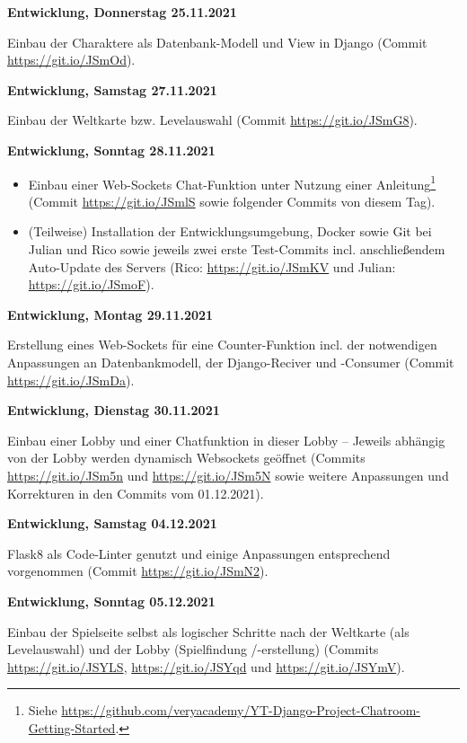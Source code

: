 \textbf{Entwicklung, Donnerstag 25.11.2021}

Einbau der Charaktere als Datenbank-Modell und View in Django (Commit \url{https://git.io/JSmOd}).



\textbf{Entwicklung, Samstag 27.11.2021}

Einbau der Weltkarte bzw. Levelauswahl (Commit \url{https://git.io/JSmG8}).



\textbf{Entwicklung, Sonntag 28.11.2021}

\begin{itemize}
    \item Einbau einer Web-Sockets Chat-Funktion unter Nutzung einer Anleitung\footnote{Siehe \url{https://github.com/veryacademy/YT-Django-Project-Chatroom-Getting-Started}. } (Commit \url{https://git.io/JSmlS} sowie folgender Commits von diesem Tag).
    \item (Teilweise) Installation der Entwicklungsumgebung, Docker sowie Git bei Julian und Rico sowie jeweils zwei erste Test-Commits incl. anschließendem Auto-Update des Servers (Rico: \url{https://git.io/JSmKV} und Julian: \url{https://git.io/JSmoF}).
\end{itemize}



\textbf{Entwicklung, Montag 29.11.2021}

Erstellung eines Web-Sockets für eine Counter-Funktion incl. der notwendigen Anpassungen an Datenbankmodell, der Django-Reciver und -Consumer (Commit \url{https://git.io/JSmDa}).



\textbf{Entwicklung, Dienstag 30.11.2021}

Einbau einer Lobby und einer Chatfunktion in dieser Lobby -- Jeweils abhängig von der Lobby werden dynamisch Websockets geöffnet (Commits \url{https://git.io/JSm5n} und \url{https://git.io/JSm5N} sowie weitere Anpassungen und Korrekturen in den Commits vom 01.12.2021).


\textbf{Entwicklung, Samstag 04.12.2021}

Flask8 als Code-Linter genutzt und einige Anpassungen entsprechend vorgenommen (Commit \url{https://git.io/JSmN2}).


\textbf{Entwicklung, Sonntag 05.12.2021}

Einbau der Spielseite selbst als logischer Schritte nach der Weltkarte (als Levelauswahl) und der Lobby (Spielfindung /-erstellung) (Commits \url{https://git.io/JSYLS}, \url{https://git.io/JSYqd} und \url{https://git.io/JSYmV}).



